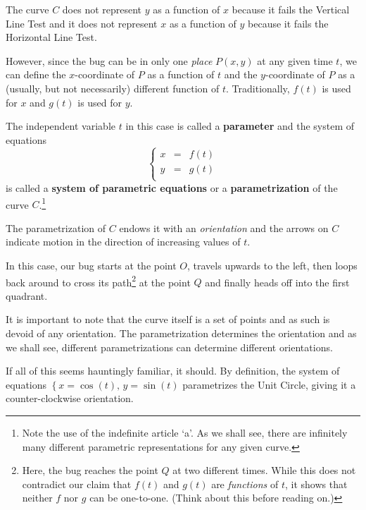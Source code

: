 \documentclass{ximera}
\begin{document}
The curve $C$ does not represent $y$ as a function of $x$ because it fails the Vertical Line Test and it does not represent $x$ as a function of $y$ because it fails the Horizontal Line Test.  

 

However, since the bug can be in only one \textit{place} $P(x,y)$ at any given time $t$, we can define the $x$-coordinate of $P$ as a function of $t$ and the $y$-coordinate of $P$ as a (usually, but not necessarily) different function of $t$.  Traditionally, $f(t)$ is used for $x$ and $g(t)$ is used for $y$.

 

The independent variable $t$ in this case is called a  \textbf{parameter} and the system of equations \[\left\{ \begin{array}{rcl} x & = & f(t) \\ y & = & g(t) \\ \end{array} \right.\] is called a  \textbf{system of parametric equations} or a  \textbf{parametrization} of the curve $C$.\footnote{Note the use of the indefinite article `a'.  As we shall see, there are infinitely many different parametric representations for any given curve.}   

 

The parametrization of $C$ endows it with an  \textit{orientation} and the arrows on $C$ indicate motion in the direction of increasing values of $t$. 

 

In this case, our bug starts at the point $O$, travels upwards to the left, then loops back around to cross its path\footnote{Here, the bug reaches the point $Q$ at two different times. While this does not contradict our claim that $f(t)$ and $g(t)$ are \textit{functions} of $t$, it shows that neither $f$ nor $g$ can be one-to-one.  (Think about this before reading on.)} at the point $Q$ and finally heads off into the first quadrant. 

 

  It is important to note that the curve itself is a set of points and as such is devoid of any orientation.  The parametrization determines the orientation and as we shall see, different parametrizations can determine different orientations. 
  
   
  
  If all of this seems hauntingly familiar, it should.  By definition, the system of equations $\left\{ x = \cos(t), \, y = \sin(t) \right.$ parametrizes the Unit Circle, giving it a counter-clockwise orientation.  
  
\end{document}

